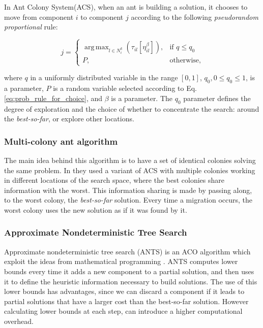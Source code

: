 					In Ant Colony System(ACS), when an ant is building a solution, it chooses to move from component $i$ to component $j$ according to the following \emph{pseudorandom proportional} rule:

					\begin{equation} 
						\label{eq:acs_choice_rule}
						j =
						  \begin{cases}
						   \operatorname{arg\,\max}_{l \in N_{i}^k} (\tau_{il}[\eta_{il}^{\beta}]), & \text{if } q \leq q_{0}  \\
						  	P, & \text{otherwise,}
						  \end{cases}
					\end{equation}

					\noindent where $q$ in a uniformly distributed variable in the range $[0,1]$, $q_{0}, 0 \leq q_{0} \leq 1$, is a parameter, $P$ is a random variable selected according to Eq. \eqref{eq:prob_rule_for_choice}, and $\beta$ is a parameter. The $q_{0}$ parameter defines the degree of exploration and the choice of whether to concentrate the search: around the \emph{best-so-far}, or explore other locations.

					\subsubsection*{Multi-colony ant algorithm}
					The main idea behind this algorithm is to have a set of identical colonies solving the same problem. In \cite{melo10} they used a variant of ACS with multiple colonies working in different locations of the search space, where the best colonies share information with the worst. This information sharing is made by passing along, to the worst colony, the \emph{best-so-far} solution. Every time a migration occurs, the worst colony uses the new solution as if it was found by it.


					\subsubsection*{Approximate Nondeterministic Tree Search}
					Approximate nondeterministic tree search (ANTS) is an ACO algorithm which exploit the ideas from mathematical programming \cite{Maniezzo99}. ANTS computes lower bounds every time it adds a new component to a partial solution, and then uses it to define the heuristic information necessary to build solutions. The use of this lower bounds has advantages, since we can discard a component if it leads to partial solutions that have a larger cost than the best-so-far solution. However calculating lower bounds at each step, can introduce a higher computational overhead.


